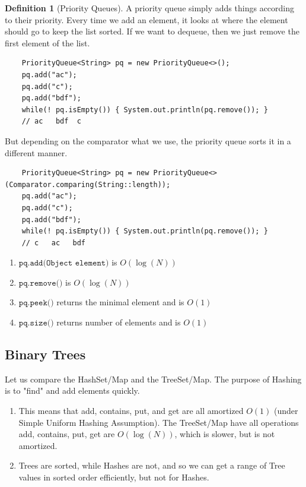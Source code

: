 \documentclass{article}
\theoremstyle{definition}
\theoremstyle{remark}
\theoremstyle{definition}
\newtheorem{definition}{Definition}[section]
\begin{document}
\begin{definition}[Priority Queues]
A priority queue simply adds things according to their priority. Every time we add an element, it looks at where the element should go to keep the list sorted. If we want to dequeue, then we just remove the first element of the list. 
\begin{verbatim}
    PriorityQueue<String> pq = new PriorityQueue<>();
    pq.add("ac"); 
    pq.add("c"); 
    pq.add("bdf"); 
    while(! pq.isEmpty()) { System.out.println(pq.remove()); }
    // ac   bdf  c
\end{verbatim}
But depending on the comparator what we use, the priority queue sorts it in a different manner. 
\begin{verbatim}
    PriorityQueue<String> pq = new PriorityQueue<>(Comparator.comparing(String::length)); 
    pq.add("ac"); 
    pq.add("c"); 
    pq.add("bdf"); 
    while(! pq.isEmpty()) { System.out.println(pq.remove()); }
    // c   ac   bdf
\end{verbatim}
\begin{enumerate}
    \item $\texttt{pq.add(Object element)}$ is $O(\log(N))$
    \item $\texttt{pq.remove()}$ is $O(\log(N))$ 
    \item $\texttt{pq.peek()}$ returns the minimal element and is $O(1)$
    \item $\texttt{pq.size()}$ returns number of elements and is $O(1)$
\end{enumerate}
\end{definition}

\subsection{Binary Trees}

Let us compare the HashSet/Map and the TreeSet/Map. The purpose of Hashing is to "find" and add elements quickly. 
\begin{enumerate}
    \item This means that add, contains, put, and get are all amortized $O(1)$ (under Simple Uniform Hashing Assumption). The TreeSet/Map have all operations add, contains, put, get are $O(\log(N))$, which is slower, but is not amortized. 
    \item Trees are sorted, while Hashes are not, and so we can get a range of Tree values in sorted order efficiently, but not for Hashes. 
\end{enumerate}
\end{document}
